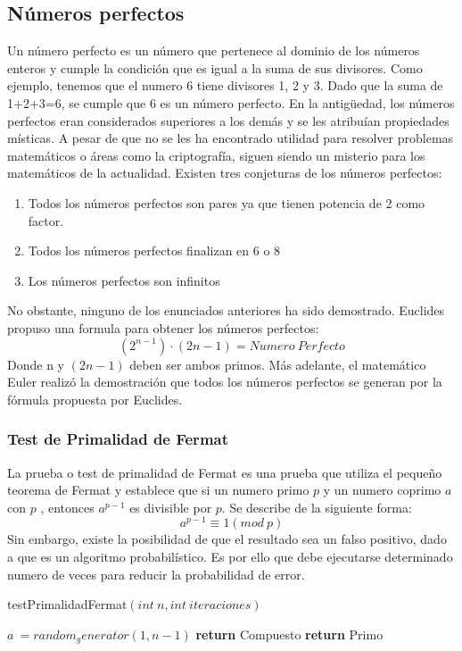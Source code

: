 \documentclass[12pt,twoside]{article}
\begin{document}
\subsection{N\'umeros perfectos}

Un n\'umero perfecto es un n\'umero que pertenece al dominio de los números enteros y cumple la condición que es igual a la suma de sus divisores. Como ejemplo, tenemos que el numero 6 tiene divisores 1, 2 y 3. Dado que la suma de 1+2+3=6, se cumple que 6 es un n\'umero perfecto.
\newline\newline
En la antigüedad, los números perfectos eran considerados superiores a los demás y se les atribuían propiedades místicas. A pesar de que no se les ha encontrado utilidad para resolver problemas matemáticos o áreas como la criptografía, siguen siendo un misterio para los matemáticos de la actualidad.
\newline\newline
Existen tres conjeturas de los números perfectos:
\begin{enumerate}
    \item Todos los números perfectos son pares ya que tienen potencia de 2 como factor.
    \item Todos los números perfectos finalizan en 6 o 8
    \item Los números perfectos son infinitos
\end{enumerate}
No obstante, ninguno de los enunciados anteriores ha sido demostrado.
\newline
Euclides propuso una formula para obtener los números perfectos:
$$(2^{n-1})\cdot(2{n} - 1) = Numero\: Perfecto$$ 
Donde n  y $(2{n} - 1)$ deben ser ambos primos.
Más adelante, el matemático Euler realizó la demostración que todos los números perfectos se generan por la fórmula propuesta por Euclides.

\subsubsection{Test de Primalidad de Fermat}
La prueba o test de primalidad de Fermat es una prueba que utiliza el pequeño teorema de Fermat y establece que si un numero primo $p$ y un numero coprimo $a$ con $p$ , entonces $a^{p-1}$ es divisible por $p$. Se describe de la siguiente forma:
$$a^{p-1} \equiv 1(mod\:p)$$
Sin embargo, existe la posibilidad de que el resultado sea un falso positivo, dado a que es un algoritmo probabilístico. Es por ello que debe ejecutarse determinado numero de veces para reducir la probabilidad de error.
\begin{algorithm}[H]
  \caption{testPrimalidadFermat$(int~n, int~iteraciones)$}
  \begin{algorithmic}[1]
    
      \State $a~=random_generator(1,n-1)$
        \State \textbf{return} Compuesto
    \EndIf
    \EndFor
    \State \textbf{return} Primo
    
  \end{algorithmic}
\end{algorithm}
\end{document}
